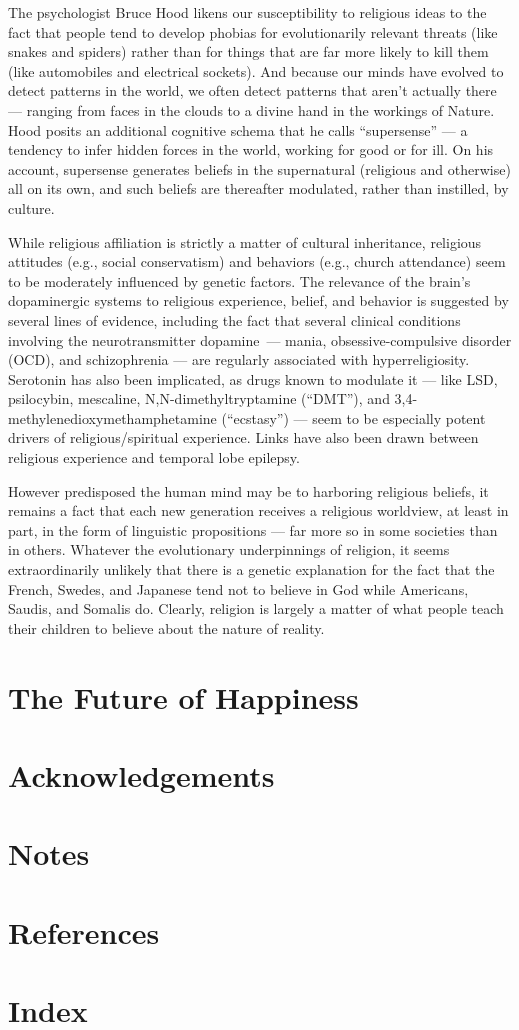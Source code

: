 \documentclass[a4paper,14pt]{extarticle}
\begin{document}
The psychologist Bruce Hood likens our susceptibility to religious ideas to the fact that people tend to develop phobias for evolutionarily relevant threats (like snakes and spiders) rather than for things that are far more likely to kill them (like automobiles and electrical sockets).
And because our minds have evolved to detect patterns in the world, we often detect patterns that aren’t actually there --- ranging from faces in the clouds to a divine hand in the workings of Nature.
Hood posits an additional cognitive schema that he calls ``supersense'' --- a tendency to infer hidden forces in the world, working for good or for ill.
On his account, supersense generates beliefs in the supernatural (religious and otherwise) all on its own, and such beliefs are thereafter modulated, rather than instilled, by culture.

While religious affiliation is strictly a matter of cultural inheritance, religious attitudes (e.g., social conservatism) and behaviors (e.g., church attendance) seem to be moderately influenced by genetic factors.
The relevance of the brain’s dopaminergic systems to religious experience, belief, and behavior is suggested by several lines of evidence, including the fact that several clinical conditions involving the neurotransmitter dopamine\ --- mania, obsessive-compulsive disorder (OCD), and schizophrenia --- are regularly associated with hyperreligiosity.
Serotonin has also been implicated, as drugs known to modulate it --- like LSD, psilocybin, mescaline, N,N-dimethyltryptamine (``DMT''), and 3,4-methylenedioxymethamphetamine (``ecstasy'') --- seem to be especially potent drivers of religious/spiritual experience.
Links have also been drawn between religious experience and temporal lobe epilepsy.

However predisposed the human mind may be to harboring religious beliefs, it remains a fact that each new generation receives a religious worldview, at least in part, in the form of linguistic propositions --- far more so in some societies than in others.
Whatever the evolutionary underpinnings of religion, it seems extraordinarily unlikely that there is a genetic explanation for the fact that the French, Swedes, and Japanese tend not to believe in God while Americans, Saudis, and Somalis do.
Clearly, religion is largely a matter of what people teach their children to believe about the nature of reality.

\newpage
\section{The Future of Happiness}

\newpage
\section{Acknowledgements}

\newpage
\section{Notes}

\newpage
\section{References}

\newpage
\section{Index}
\end{document}
